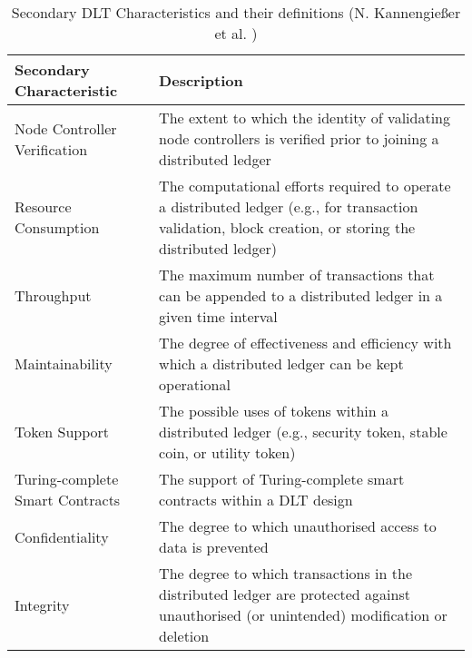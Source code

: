 \begin{table}[H]
    \centering

    \caption{Secondary DLT Characteristics and their definitions (N. Kannengießer et al. \cite{dlt_4})}
    \label{tab:seconddltchars}
\begin{tabular}{|m{5cm}|m{10cm}|}
\hline
\cellcolor{gray!15}\textbf{Secondary Characteristic} & \cellcolor{gray!15}\textbf{Description} \\ \hline\hline
Node Controller Verification & The extent to which the identity of validating node controllers is verified prior to joining a distributed ledger \\ [12pt]\hline\hline
Resource Consumption & The computational efforts required to operate a distributed ledger (e.g., for transaction validation, block creation, or storing the distributed ledger) \\ [12pt]\hline
Throughput & The maximum number of transactions that can be appended to a distributed ledger in a given time interval \\ [12pt]\hline\hline
Maintainability & The degree of effectiveness and efficiency with which a distributed ledger can be kept operational \\ [12pt]\hline
Token Support & The possible uses of tokens within a distributed ledger (e.g., security token, stable coin, or utility token) \\ [12pt]\hline
Turing-complete \newline Smart Contracts & The support of Turing-complete smart contracts within a DLT design \\ [12pt]\hline\hline
\rule{0pt}{4ex}Confidentiality & \rule{0pt}{3ex}The degree to which unauthorised access to data is prevented \\ [12pt]\hline
Integrity & The degree to which transactions in the distributed ledger are protected against unauthorised (or unintended) modification or deletion \\ \hline

\end{tabular}

\end{table}

